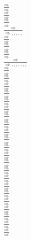 \documentclass[11pt]{article}
\begin{document}
\begin{center}
\bigskip
\\$\frac{\Rightarrow }{\Rightarrow }$
\bigskip
\\$\frac{\Rightarrow }{\Rightarrow }$
\bigskip
\\$\frac{\Rightarrow }{\Rightarrow }$
\bigskip
\\$\frac{\Rightarrow }{\Rightarrow , , , , , }$
\bigskip
\\$\frac{\Rightarrow }{\Rightarrow }$
\bigskip
\\$\frac{\Rightarrow }{\Rightarrow }$
\bigskip
\\$\frac{\Rightarrow }{\Rightarrow }$
\bigskip
\\$\frac{\Rightarrow }{\Rightarrow , , , , , , , }$
\bigskip
\\$\frac{\Rightarrow }{\Rightarrow }$
\bigskip
\\$\frac{\Rightarrow }{\Rightarrow }$
\bigskip
\\$\frac{\Rightarrow }{\Rightarrow }$
\bigskip
\\$\frac{\Rightarrow }{\Rightarrow }$
\bigskip
\\$\frac{\Rightarrow }{\Rightarrow }$
\bigskip
\\$\frac{\Rightarrow }{\Rightarrow }$
\bigskip
\\$\frac{\Rightarrow }{\Rightarrow }$
\bigskip
\\$\frac{\Rightarrow }{\Rightarrow }$
\bigskip
\\$\frac{\Rightarrow }{\Rightarrow }$
\bigskip
\\$\frac{\Rightarrow }{\Rightarrow }$
\bigskip
\\$\frac{\Rightarrow }{\Rightarrow }$
\bigskip
\\$\frac{\Rightarrow }{\Rightarrow }$
\bigskip
\\$\frac{\Rightarrow }{\Rightarrow }$
\bigskip
\\$\frac{\Rightarrow }{\Rightarrow }$
\bigskip
\\$\frac{\Rightarrow }{\Rightarrow }$
\bigskip
\\$\frac{\Rightarrow }{\Rightarrow }$
\bigskip
\\$\frac{\Rightarrow }{\Rightarrow }$
\bigskip
\\$\frac{\Rightarrow }{\Rightarrow }$
\bigskip
\\$\frac{\Rightarrow }{\Rightarrow }$
\bigskip
\\$\frac{\Rightarrow }{\Rightarrow }$
\bigskip
\\$\frac{\Rightarrow }{\Rightarrow }$
\bigskip
\\$\frac{\Rightarrow }{\Rightarrow }$

\end{center}
\end{document}
